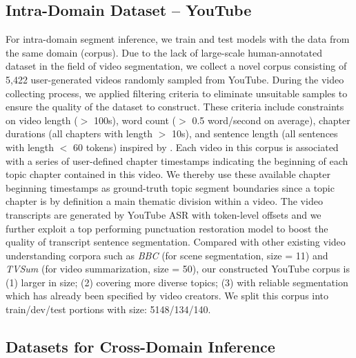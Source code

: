 \documentclass[runningheads]{llncs}
\begin{document}
\vspace{-2ex}
\subsection{Intra-Domain Dataset -- YouTube} \label{sec:datasets}
For intra-domain segment inference,  we train and test models with the data from the same domain (corpus). Due to the lack of large-scale human-annotated dataset in the field of video segmentation, %
we collect a novel corpus consisting of 5,422 user-generated videos randomly sampled from YouTube. %
During the video collecting process, we applied filtering criteria to eliminate unsuitable samples to ensure the quality of the dataset to construct. These criteria include constraints on video length ($>$ 100s), word count ($>$ 0.5 word/second on average), chapter durations (all chapters with length $>$ 10s), and sentence length (all sentences with length $<$ 60 tokens) inspired by \cite{cao2022multimodal}.
Each video in this corpus is associated with a series of user-defined chapter timestamps indicating the beginning of each topic chapter contained in this video. We thereby use these available chapter beginning timestamps as ground-truth topic segment boundaries since a topic chapter is by definition a main thematic division within a video. The video transcripts are generated by YouTube ASR with token-level offsets and we further exploit a top performing punctuation restoration model \cite{alam-etal-2020-punctuation} to boost the quality of transcript sentence segmentation. Compared with other existing video understanding corpora such as \textit{BBC} \cite{Lorenzo-etal-2015} (for scene segmentation, size = 11) and \textit{TVSum} \cite{7299154} (for video summarization, size = 50), our constructed YouTube corpus is (1) larger in size; (2) covering more diverse topics; (3) with reliable segmentation which has already been specified by video creators. We split this corpus into train/dev/test portions with size: 5148/134/140.

\vspace{-2.5ex}
\subsection{Datasets for Cross-Domain Inference}
\iffalse
\begin{figure}
    \centering
    \texttt{[image: samples/categories\_v2.png]}
    \caption{Histogram of YouTube video corpus category distribution (y-axis: number of videos).}
    \label{fig:category_dist}
\end{figure}
\fi
\end{document}
